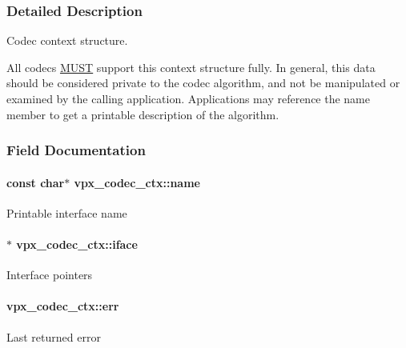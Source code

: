 \subsubsection{Detailed Description}
Codec context structure. 

All codecs \hyperlink{rfc2119_MUST}{M\+U\+ST} support this context structure fully. In general, this data should be considered private to the codec algorithm, and not be manipulated or examined by the calling application. Applications may reference the \textquotesingle{}name\textquotesingle{} member to get a printable description of the algorithm. 

\subsubsection{Field Documentation}
\paragraph[{\texorpdfstring{name}{name}}]{\setlength{\rightskip}{0pt plus 5cm}const char$\ast$ vpx\+\_\+codec\+\_\+ctx\+::name}\hypertarget{structvpx__codec__ctx_a7ed1bf8f6434ea2df01da8011849c6cb}{}\label{structvpx__codec__ctx_a7ed1bf8f6434ea2df01da8011849c6cb}
Printable interface name 
\paragraph[{\texorpdfstring{iface}{iface}}]{$\ast$ vpx\+\_\+codec\+\_\+ctx\+::iface}\hypertarget{structvpx__codec__ctx_af5986790e3420beda77f3a9b64f6b953}{}\label{structvpx__codec__ctx_af5986790e3420beda77f3a9b64f6b953}
Interface pointers 
\paragraph[{\texorpdfstring{err}{err}}]{ vpx\+\_\+codec\+\_\+ctx\+::err}\hypertarget{structvpx__codec__ctx_a6f448802b0675013fd8c5179675c30de}{}\label{structvpx__codec__ctx_a6f448802b0675013fd8c5179675c30de}
Last returned error 
